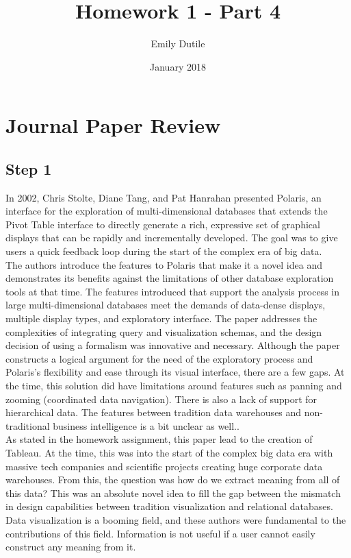 \documentclass{neu_handout}
\title{Homework 1 - Part 4}
\author{Emily Dutile}
\date{January 2018}
\begin{document}
\section*{Journal Paper Review}

\subsection*{Step 1}

In 2002, Chris Stolte, Diane Tang, and Pat Hanrahan presented Polaris, an interface for the exploration of multi-dimensional databases that extends the Pivot Table interface to directly generate a rich, expressive set of graphical displays that can be rapidly and incrementally developed. The goal was to give users a quick feedback loop during the start of the complex era of big data. \\

The authors introduce the features to Polaris that make it a novel idea and demonstrates its benefits against the limitations of other database exploration tools at that time. The features introduced that support the analysis process in large multi-dimensional databases meet the demands of data-dense displays, multiple display types, and exploratory interface. The paper addresses the complexities of integrating query and visualization schemas, and the design decision of using a formalism was innovative and necessary. Although the paper constructs a logical argument for the need of the exploratory process and Polaris's flexibility and ease through its visual interface, there are a few gaps. At the time, this solution did have limitations around features such as panning and zooming (coordinated data navigation). There is also a lack of support for hierarchical data. The features between tradition data warehouses and non-traditional business intelligence is a bit unclear as well..  \\

As stated in the homework assignment, this paper lead to the creation of Tableau. At the time, this was into the start of the complex big data era with massive tech companies and scientific projects creating huge corporate data warehouses. From this, the question was how do we extract meaning from all of this data? This was an absolute novel idea to fill the gap between the mismatch in design capabilities between tradition visualization and relational databases. Data visualization is a booming field, and these authors were fundamental to the contributions of this field. Information is not useful if a user cannot easily construct any meaning from it.
\end{document}

